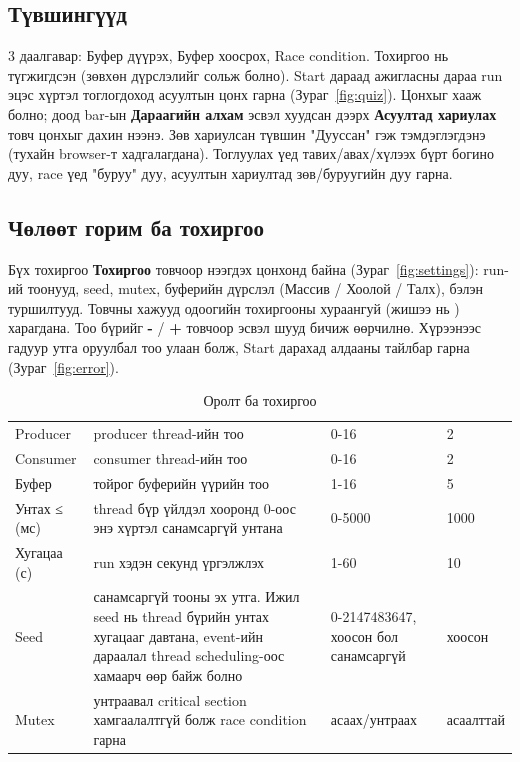 \documentclass[12pt,a4paper]{article}
\begin{document}

\subsection{Түвшингүүд}\label{sec:levels}
3 даалгавар: Буфер дүүрэх, Буфер хоосрох, Race condition. Тохиргоо нь түгжигдсэн (зөвхөн дүрслэлийг сольж болно). Start дараад ажигласны дараа run эцэс хүртэл тоглогдоход асуултын цонх гарна (Зураг~\ref{fig:quiz}). Цонхыг хааж болно; доод bar-ын \textbf{Дараагийн алхам} эсвэл хуудсан дээрх \textbf{Асуултад хариулах} товч цонхыг дахин нээнэ. Зөв хариулсан түвшин "Дууссан" гэж тэмдэглэгдэнэ (тухайн browser-т хадгалагдана). Тоглуулах үед тавих/авах/хүлээх бүрт богино дуу, race үед "буруу" дуу, асуултын хариултад зөв/буруугийн дуу гарна.


\subsection{Чөлөөт горим ба тохиргоо}\label{sec:play}
Бүх тохиргоо \textbf{Тохиргоо} товчоор нээгдэх цонхонд байна (Зураг~\ref{fig:settings}): run-ий тоонууд, seed, mutex, буферийн дүрслэл (Массив / Хоолой / Талх), бэлэн туршилтууд. Товчны хажууд одоогийн тохиргооны хураангуй (жишээ нь ) харагдана. Тоо бүрийг \textbf{-} / \textbf{+} товчоор эсвэл шууд бичиж өөрчилнө. Хүрээнээс гадуур утга оруулбал тоо улаан болж, Start дарахад алдааны тайлбар гарна (Зураг~\ref{fig:error}).

\begin{table}[H]\centering\small
\caption{Оролт ба тохиргоо}\label{tab:input}
\begin{tabular}{|L{0.17\textwidth}|L{0.43\textwidth}|L{0.24\textwidth}|L{0.16\textwidth}|}\hline
{} &  &  &  \\\hline
Producer & producer thread-ийн тоо & 0-16 & 2 \\\hline
Consumer & consumer thread-ийн тоо & 0-16 & 2 \\\hline
Буфер & тойрог буферийн үүрийн тоо & 1-16 & 5 \\\hline
Унтах ≤ (мс) & thread бүр үйлдэл хооронд 0-оос энэ хүртэл санамсаргүй унтана & 0-5000 & 1000 \\\hline
Хугацаа (с) & run хэдэн секунд үргэлжлэх & 1-60 & 10 \\\hline
Seed & санамсаргүй тооны эх утга. Ижил seed нь thread бүрийн унтах хугацааг давтана, event-ийн дараалал thread scheduling-оос хамаарч өөр байж болно & 0-2147483647, хоосон бол санамсаргүй & хоосон \\\hline
Mutex & унтраавал critical section хамгаалалтгүй болж race condition гарна & асаах/унтраах & асаалттай \\\hline
\end{tabular}
\end{table}
\end{document}
